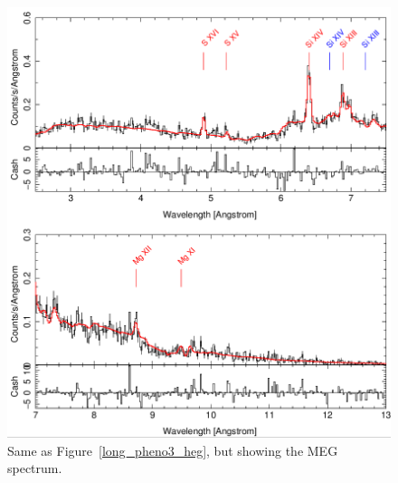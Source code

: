 \begin{figure}[t]
    \centering
        \includegraphics[width = \linewidth]{Chapters/Figures/long_pheno3_meg.png}
        \caption{Same as Figure~\ref{long_pheno3_heg}, but showing the MEG spectrum.}
    \label{long_pheno3_meg}
\end{figure}



